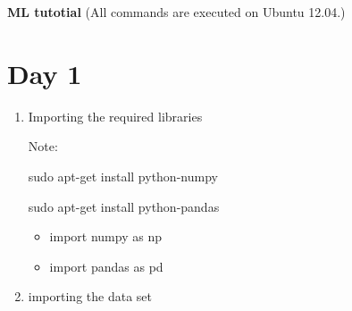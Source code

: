 \documentclass[12pt,a4paper,oneside]{article}
\begin{document}
\noindent
{\large \bf ML tutotial } (All commands are executed on Ubuntu 12.04.)

\section{Day 1}
\begin{enumerate}
\item Importing the required libraries

Note: 

sudo apt-get install python-numpy

sudo apt-get install python-pandas

\begin{itemize}
\item import numpy as np
\item import pandas as pd
\end{itemize}

\item importing the data set
\end{enumerate}
\end{document}
